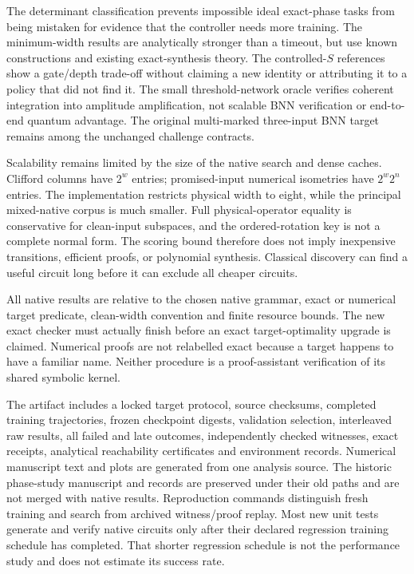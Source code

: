 \documentclass[11pt]{article}
\begin{document}
The determinant classification prevents impossible ideal exact-phase tasks from being mistaken for evidence that the controller needs more training. The minimum-width results are analytically stronger than a timeout, but use known constructions and existing exact-synthesis theory. The controlled-$S$ references show a gate/depth trade-off without claiming a new identity or attributing it to a policy that did not find it. The small threshold-network oracle verifies coherent integration into amplitude amplification, not scalable BNN verification or end-to-end quantum advantage. The original multi-marked three-input BNN target remains among the unchanged challenge contracts.

Scalability remains limited by the size of the native search and dense caches. Clifford columns have $2^w$ entries; promised-input numerical isometries have $2^w2^n$ entries. The implementation restricts physical width to eight, while the principal mixed-native corpus is much smaller. Full physical-operator equality is conservative for clean-input subspaces, and the ordered-rotation key is not a complete normal form. The scoring bound therefore does not imply inexpensive transitions, efficient proofs, or polynomial synthesis. Classical discovery can find a useful circuit long before it can exclude all cheaper circuits.

All native results are relative to the chosen native grammar, exact or numerical target predicate, clean-width convention and finite resource bounds. The new exact checker must actually finish before an exact target-optimality upgrade is claimed. Numerical proofs are not relabelled exact because a target happens to have a familiar name. Neither procedure is a proof-assistant verification of its shared symbolic kernel.

The artifact includes a locked target protocol, source checksums, completed training trajectories, frozen checkpoint digests, validation selection, interleaved raw results, all failed and late outcomes, independently checked witnesses, exact receipts, analytical reachability certificates and environment records. Numerical manuscript text and plots are generated from one analysis source. The historic phase-study manuscript and records are preserved under their old paths and are not merged with native results. Reproduction commands distinguish fresh training and search from archived witness/proof replay. Most new unit tests generate and verify native circuits only after their declared regression training schedule has completed. That shorter regression schedule is not the performance study and does not estimate its success rate.
\end{document}
